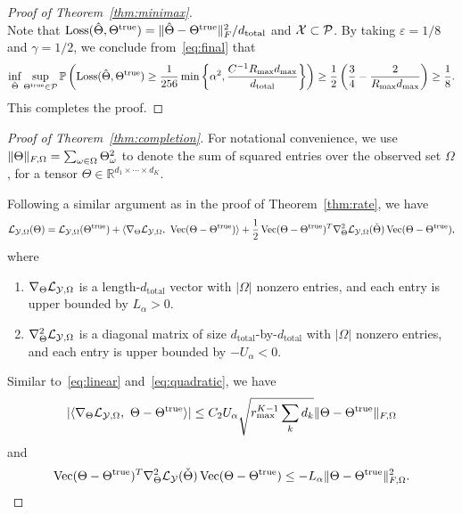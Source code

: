 \documentclass[11pt]{article}
\theoremstyle{plain}
\theoremstyle{definition}
\begin{document}
\begin{proof}[Proof of Theorem~\ref{thm:minimax}]
\begin{equation}
\end{equation}
Note that $\text{Loss}(\hat \Theta, \Theta^{\text{true}})=\lVert\hat \Theta- \Theta^{\text{true}}\rVert_F^2/d_{\text{total}}$ and $\mathcal{X}\subset \mathcal{P}$. By taking $\varepsilon=1/8$ and $\gamma=1/2$, we conclude from~\eqref{eq:final} that
\begin{equation*}\label{eq:prob}
\inf_{\hat \Theta}\sup_{\Theta^{\text{true}}\in \mathcal{P}}\mathbb{P}\left(\text{Loss}(\hat \Theta, \Theta^{\text{true}})\geq {1 \over 256}\min\left \{ \alpha^2,  {C^{-1}R_{\max}d_{\max}\over d_{\text{total}}}\right \}\right)\geq {1\over 2}\left({3\over 4}- {2\over R_{\max}d_{\max}} \right)\geq {1\over 8}.
\end{equation*}
This completes the proof. 
\end{proof}


\begin{proof}[Proof of Theorem~\ref{thm:completion}]

For notational convenience, we use $\lVert\Theta\rVert_{F,\Omega}=\sum_{\omega\in\Omega}\Theta^2_\omega$ to denote the sum of squared entries over the observed set $\Omega$, for a tensor $\Theta\in\mathbb{R}^{d_1\times \cdots \times d_K}$.

Following a similar argument as in the proof of Theorem~\ref{thm:rate}, we have
\begin{equation}\label{eq:Taylor2}
\logl(\Theta)=\logl(\trueT)+\langle\plogl,\ \Vec(\Theta-\trueT)\rangle+{1\over 2}\Vec(\Theta-\trueT)^T\pplogl(\check\Theta)\Vec(\Theta-\trueT),
\end{equation}
where
\begin{enumerate}
\item $\nabla_{\Theta}\mathcal{L}_{\mathcal{Y},\Omega}$ is a length-$d_{\text{total}}$ vector with $|\Omega|$ nonzero entries, and each entry is upper bounded by $L_\alpha>0$. 
\item $\nabla^2_{\Theta}\mathcal{L}_{\mathcal{Y},\Omega}$ is a diagonal matrix of size $d_{\text{total}}$-by-$d_{\text{total}}$ with $|\Omega|$ nonzero entries, and each entry is upper bounded by $-U_{\alpha}<0$. 
\end{enumerate}

Similar to~\eqref{eq:linear} and~\eqref{eq:quadratic}, we have
\begin{equation}\label{eq:linear2}
|\langle\nabla_{\Theta}\mathcal{L}_{\mathcal{Y},\Omega},\ \Theta-\Theta^{\text{true}}\rangle|\leq C_2U_\alpha \sqrt{r_{\max}^{K-1}\sum_k d_k}\lVert\Theta-\Theta^{\text{true}}\rVert_{F,\Omega}
\end{equation}
and
\begin{equation}\label{eq:quadratic2}
\operatorname{Vec}(\Theta-\Theta^{\text{true}})^T\nabla^2_{\Theta}\mathcal{L}_{\mathcal{Y}}(\check\Theta)\operatorname{Vec}(\Theta-\Theta^{\text{true}})\leq -L_\alpha \lVert\Theta-\Theta^{\text{true}}\rVert_{F,\Omega}^2.
\end{equation}


\end{proof}
\end{document}
